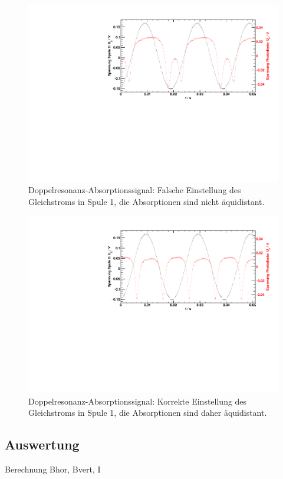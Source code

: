 \begin{figure}[H]
\begin{center}
  \includegraphics[width=\textwidth]{../img/part3/11.pdf}
  \caption{Doppelresonanz-Absorptionssignal: Falsche Einstellung des Gleichstroms in Spule 1,
  die Absorptionen sind nicht äquidistant.}
  \label{img:rfwrong}
\end{center}
\end{figure} 


\begin{figure}[H]
\begin{center}
  \includegraphics[width=\textwidth]{../img/part3/08.pdf}
  \caption{Doppelresonanz-Absorptionssignal: Korrekte Einstellung des Gleichstroms in Spule 1,
  die Absorptionen sind daher äquidistant.}
  \label{img:rfcorrect}
\end{center}
\end{figure} 

\subsection{Auswertung}
Berechnung Bhor, Bvert, I